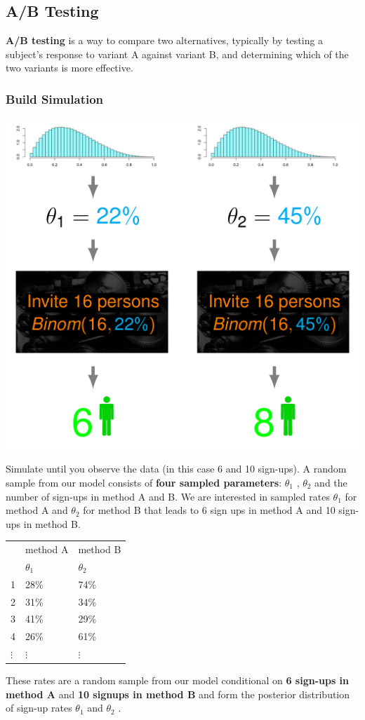\documentclass[11pt]{article}
\begin{document}
\subsection{A/B Testing}
\textbf{A/B testing} is a way to compare two alternatives, typically by testing a subject's response to variant A against variant B, and determining which of the two variants is more effective.

\subsubsection{Build Simulation}

\begin{center}
	\includegraphics[width=0.5\linewidth]{img/ab_simulation_model}
\end{center}

Simulate until you observe the data (in this case 6 and 10 sign-ups). A random sample from our model consists of \textbf{four sampled parameters}: $\theta_1$ , $\theta_2$ and the number of sign-ups in method A and B. We are interested in sampled rates $\theta_1$ for method A and $\theta_2$ for method B that leads to 6 sign ups in method A and 10 sign-ups in method B.

\begin{tabularx}{\linewidth}{l l l}
	& method A & method B\\
	& $\theta_1$ & $\theta_2$\\
	1 & 28\% & 74\% \\
	2 & 31\% & 34\% \\
	3 & 41\% & 29\% \\
	4 & 26\% & 61\% \\
	$\vdots$ & $\vdots$ & $\vdots$
\end{tabularx}

These rates are a random sample from our model conditional on \textbf{6 sign-ups in method A} and \textbf{10 signups in method B} and form the posterior distribution of sign-up rates $\theta_1$ and $\theta_2$ .
\end{document}
